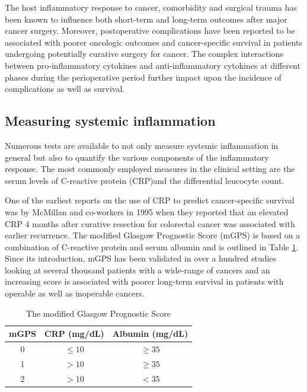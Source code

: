 The host inflammatory response to cancer, comorbidity and surgical trauma has been known to influence both short-term and long-term outcomes after major cancer surgery. Moreover, postoperative complications have been reported to be associated with poorer oncologic outcomes and cancer-specific survival in patients undergoing potentially curative surgery for cancer. The complex interactions between pro-inflammatory cytokines and anti-inflammatory cytokines at different phases during the perioperative period further impact upon the incidence of complications as well as survival.

\subsection{Measuring systemic inflammation}
Numerous tests are available to not only measure systemic inflammation in general but also to quantify the various components of the inflammatory response. The most commonly employed measures in the clinical setting are the serum levels of C-reactive protein (CRP)and the differential leucocyte count. 

One of the earliest reports on the use of CRP to predict cancer-specific survival was by McMillan and co-workers in 1995 when they reported that an elevated CRP 4 months after curative resection for colorectal cancer was associated with earlier recurrence.\parencite{mcmillan_prospective_1995} The modified Glasgow Prognostic Score (mGPS)\parencite{elahi_score_2004} is based on a combination of C-reactive protein and serum albumin and is outlined in Table \ref{table:mGPS}. Since its introduction, mGPS has been validated in over a hundred studies looking at several thousand patients with a wide-range of cancers and an increasing score is associated with poorer long-term survival in patients with operable as well as inoperable cancers.

\begin{table}[h]
	\centering
	\caption{The modified Glasgow Prognostic Score}
	\label{table:mGPS}
	\begin{tabular}{c c c}
		mGPS & CRP (mg/dL) & Albumin  (mg/dL) \\ \hline
		 0   & $\leq 10$   & $\geq 35$        \\
		 1   & $> 10$      & $\geq 35$        \\
		 2   & $> 10$      & $< 35$
	\end{tabular}
\end{table}


